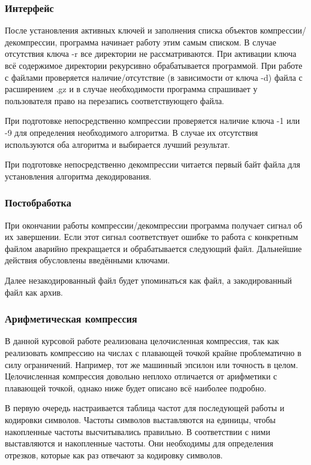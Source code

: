 \documentclass[12pt]{article}
\begin{document}
\subsubsection*{Интерфейс}

После установления активных ключей и заполнения списка объектов компрессии/декомпрессии, программа начинает работу  этим самым списком. В случае отсутствия ключа -r все директории не рассматриваются. При активации ключа всё содержимое директории рекурсивно обрабатывается программой. При работе с файлами проверяется наличие/отсутствие (в зависимости от ключа -d) файла с расширением .gz и в случае необходимости программа спрашивает у пользователя право на перезапись соответствующего файла.

При подготовке непосредственно компрессии проверяется наличие ключа -1 или -9 для определения необходимого алгоритма. В случае их отсутствия используются оба алгоритма и выбирается лучший результат.

При подготовке непосредственно декомпрессии читается первый байт файла для установления алгоритма декодирования.

\subsubsection*{Постобработка}

При окончании работы компрессии/декомпрессии программа получает сигнал об их завершении. Если этот сигнал соответствует ошибке то работа с конкретным файлом аварийно прекращается и обрабатывается следующий файл. Дальнейшие действия обусловлены введёнными ключами.

Далее незакодированный файл будет упоминаться как файл, а закодированный файл как архив.


\subsubsection*{Арифметическая компрессия}

В данной курсовой работе реализована целочисленная компрессия, так как реализовать компрессию на числах с плавающей точкой крайне проблематично в силу ограничений. Например, тот же машинный эпсилон или точность в целом. Целочисленная компрессия довольно неплохо отличается от арифметики с плавающей точкой, однако ниже будет описано всё наиболее подробно.

В первую очередь настраивается таблица частот для последующей работы и кодировки символов. Частоты символов выставляются на единицы, чтобы накопленные частоты высчитывались правильно. В соответствии с ними выставляются и накопленные частоты. Они необходимы для определения отрезков, которые как раз отвечают за кодировку символов.
\end{document}

